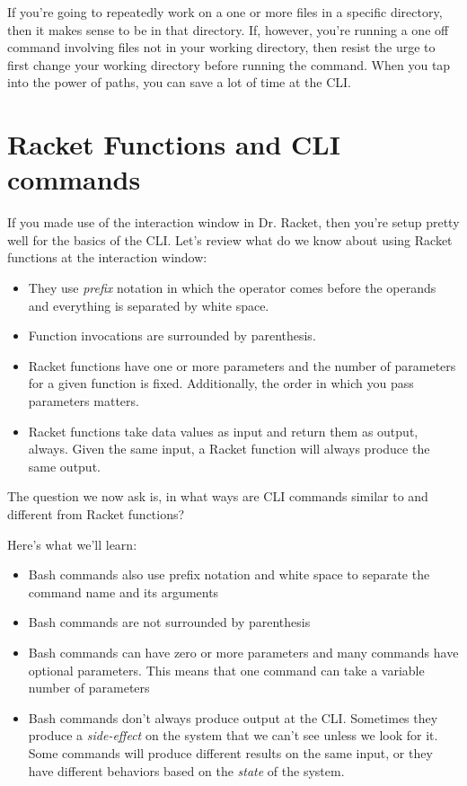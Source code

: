 \documentclass[]{tufte-handout}
\begin{document}
If you're going to repeatedly work on a one or more files in a specific directory, then it makes sense to be in that directory.  If, however, you're running a one off command involving files not in your working directory, then resist the urge to first change your working directory before running the command.  When you tap into the power of paths, you can save a lot of time at the CLI.  
 
\section{Racket Functions and CLI commands}

If you made use of the interaction window in Dr. Racket, then you're setup pretty well for the basics of the CLI. Let's review what do we know about using Racket functions at the interaction window:
\begin{itemize}
\item They use \textit{prefix} notation in which the operator comes before the operands and everything is separated by white space.
\item Function invocations are surrounded by parenthesis. 
\item Racket functions have one or more parameters and the number of parameters for a given function is fixed.  Additionally, the order in which you pass parameters matters. 
\item Racket functions take data values as input and return them as output, always. Given the same input, a Racket function will always produce the same output.
\end{itemize}
The question we now ask is, in what ways are CLI commands similar to and different from Racket functions?

Here's what we'll learn:
\begin{itemize}
\item Bash commands also use prefix notation and white space to separate the command name and its arguments
\item Bash commands are not surrounded by parenthesis
\item Bash commands can have zero or more parameters and many commands have optional parameters. This means that one command can take a variable number of parameters
\item Bash commands don't always produce output at the CLI. Sometimes they produce a \textit{side-effect} on the system that we can't see unless we look for it.  Some commands will produce different results on the same input, or they have different behaviors based on the \textit{state} of the system.
\end{itemize}
\end{document}
